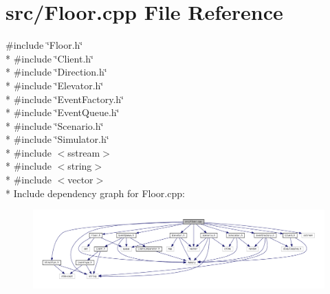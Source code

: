 \section{src/\+Floor.cpp File Reference}
\label{_floor_8cpp}
{\ttfamily \#include \char`\"{}Floor.\+h\char`\"{}}\\*
{\ttfamily \#include \char`\"{}Client.\+h\char`\"{}}\\*
{\ttfamily \#include \char`\"{}Direction.\+h\char`\"{}}\\*
{\ttfamily \#include \char`\"{}Elevator.\+h\char`\"{}}\\*
{\ttfamily \#include \char`\"{}Event\+Factory.\+h\char`\"{}}\\*
{\ttfamily \#include \char`\"{}Event\+Queue.\+h\char`\"{}}\\*
{\ttfamily \#include \char`\"{}Scenario.\+h\char`\"{}}\\*
{\ttfamily \#include \char`\"{}Simulator.\+h\char`\"{}}\\*
{\ttfamily \#include $<$sstream$>$}\\*
{\ttfamily \#include $<$string$>$}\\*
{\ttfamily \#include $<$vector$>$}\\*
Include dependency graph for Floor.\+cpp\+:
\nopagebreak
\begin{figure}[H]
\begin{center}
\leavevmode
\includegraphics[width=350pt]{_floor_8cpp__incl}
\end{center}
\end{figure}
